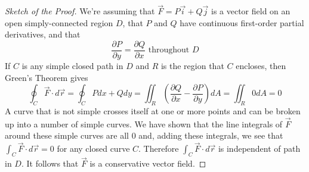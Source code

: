 \documentclass[10pt]{report}
\begin{document}
\begin{proof}[Sketch of the Proof]
We're assuming that $\vec{F} = P\vec{i} + Q\vec{j}$ is a vector field on an open simply-connected region $D$, that $P$ and $Q$ have continuous first-order partial derivatives, and that
$$\frac{\partial P}{\partial y} = \frac{\partial Q}{\partial x} \text{  throughout  } D$$
If $C$ is any simple closed path in $D$ and $R$ is the region that $C$ encloses, then Green's Theorem gives
$$\oint_C \vec{F}\cdot d\vec{r} = \oint_C Pdx+Qdy = \iint_R\left( \frac{\partial Q}{\partial x} - \frac{\partial P}{\partial y}\right)dA = \iint_R 0dA= 0$$
A curve that is not simple crosses itself at one or more points and can be broken up into a number of simple curves. We have shown that the line integrals of $\vec{F}$ around these simple curves are all $0$ and, adding these integrals, we see that $\int_C\vec{F}\cdot d\vec{r}=0$ for any closed curve $C$. Therefore $\int_C \vec{F}\cdot d\vec{r}$ is independent of path in $D$. It follows that $\vec{F}$ is a conservative vector field.
\end{proof}
\end{document}
